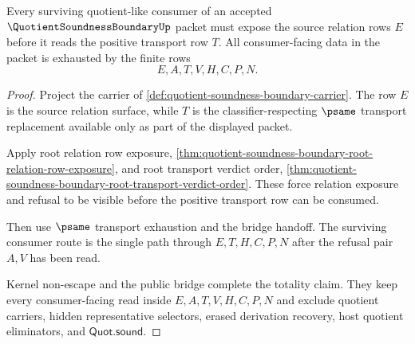 \begin{theorem}
\label{thm:quotient-soundness-boundary-source-row-consumer-totality}
Every surviving quotient-like consumer of an accepted $\QuotientSoundnessBoundaryUp$ packet must expose the source relation rows $E$ before it reads the positive transport row $T$. All consumer-facing data in the packet is exhausted by the finite rows
$$
E,A,T,V,H,C,P,N.
$$
\end{theorem}
\begin{proof}
Project the carrier of \autoref{def:quotient-soundness-boundary-carrier}. The row $E$ is the source relation surface, while $T$ is the classifier-respecting $\psame$ transport replacement available only as part of the displayed packet.

Apply root relation row exposure, \autoref{thm:quotient-soundness-boundary-root-relation-row-exposure}, and root transport verdict order, \autoref{thm:quotient-soundness-boundary-root-transport-verdict-order}. These force relation exposure and refusal to be visible before the positive transport row can be consumed.

Then use $\psame$ transport exhaustion and the bridge handoff. The surviving consumer route is the single path through $E,T,H,C,P,N$ after the refusal pair $A,V$ has been read.

Kernel non-escape and the public bridge complete the totality claim. They keep every consumer-facing read inside $E,A,T,V,H,C,P,N$ and exclude quotient carriers, hidden representative selectors, erased derivation recovery, host quotient eliminators, and $\mathsf{Quot.sound}$.
\end{proof}

